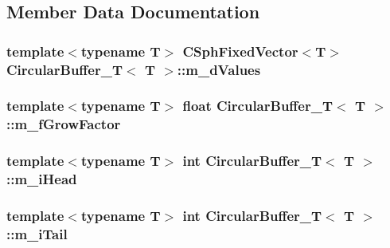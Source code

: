 \subsection{Member Data Documentation}
\hypertarget{classCircularBuffer__T_aba31032d942b7729b5858059ec1944f9}{
\subsubsection[{m\-\_\-d\-Values}]{\setlength{\rightskip}{0pt plus 5cm}template$<$typename T$>$ {\bf C\-Sph\-Fixed\-Vector}$<$T$>$ {\bf Circular\-Buffer\-\_\-\-T}$<$ T $>$\-::m\-\_\-d\-Values\hspace{0.3cm}{\ttfamily [private]}}}\label{classCircularBuffer__T_aba31032d942b7729b5858059ec1944f9}
\hypertarget{classCircularBuffer__T_a776a128440e5794ef368e6ad89dd2473}{
\subsubsection[{m\-\_\-f\-Grow\-Factor}]{\setlength{\rightskip}{0pt plus 5cm}template$<$typename T$>$ {\bf float} {\bf Circular\-Buffer\-\_\-\-T}$<$ T $>$\-::m\-\_\-f\-Grow\-Factor\hspace{0.3cm}{\ttfamily [private]}}}\label{classCircularBuffer__T_a776a128440e5794ef368e6ad89dd2473}
\hypertarget{classCircularBuffer__T_a65e4e634ec7e8a6cbfb02d7b1bee077b}{
\subsubsection[{m\-\_\-i\-Head}]{\setlength{\rightskip}{0pt plus 5cm}template$<$typename T$>$ {\bf int} {\bf Circular\-Buffer\-\_\-\-T}$<$ T $>$\-::m\-\_\-i\-Head\hspace{0.3cm}{\ttfamily [private]}}}\label{classCircularBuffer__T_a65e4e634ec7e8a6cbfb02d7b1bee077b}
\hypertarget{classCircularBuffer__T_a01b0f2612f9439feb11eac53b5089a03}{
\subsubsection[{m\-\_\-i\-Tail}]{\setlength{\rightskip}{0pt plus 5cm}template$<$typename T$>$ {\bf int} {\bf Circular\-Buffer\-\_\-\-T}$<$ T $>$\-::m\-\_\-i\-Tail\hspace{0.3cm}{\ttfamily [private]}}}\label{classCircularBuffer__T_a01b0f2612f9439feb11eac53b5089a03}
